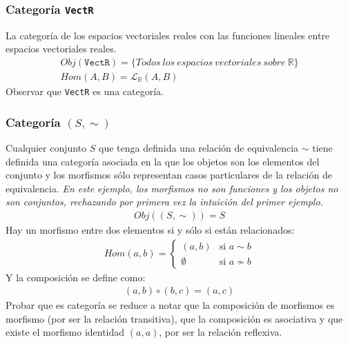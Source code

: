 \documentclass[a4paper, 11pt]{amsart}
\newcommand{\twopartdef}[4]
{
	\left\{
		\begin{array}{ll}
			#1 & \mbox{si } #2 \\
			#3 & \mbox{si } #4
		\end{array}
	\right.
}
\theoremstyle{definition}
\theoremstyle{remark}
\numberwithin{equation}{section}
\begin{document}
    \subsubsection{Categoría \texttt{VectR}}
      La categoría de los espacios vectoriales reales con las funciones lineales entre
      espacios vectoriales reales.
      \begin{gather*}
        Obj(\texttt{VectR}) = \{Todos\ los\ espacios\ vectoriales\ sobre\ \mathbb{R}\} \\
        Hom(A,B)= \mathcal{L}_{\mathbb{R}}(A,B)
      \end{gather*}
      \exca Observar que \texttt{VectR} es una categoría.
    
    \subsubsection{Categoría \texttt{$(S,\sim)$}}
      Cualquier conjunto $S$ que tenga definida una relación de equivalencia $\sim$ tiene
      definida una categoría asociada en la que los objetos son los elementos del conjunto
      y los morfismos sólo representan casos particulares de la relación de equivalencia.
      \textit{En este ejemplo, los morfismos no son funciones y los objetos no son conjuntos,
      rechazando por primera vez la intuición del primer ejemplo.}
      \begin{gather*}
        Obj((S,\sim)) = S
      \end{gather*}
      Hay un morfismo entre dos elementos si y sólo si están relacionados:
      \begin{align*}
        Hom(a,b)= \twopartdef{(a,b)}{a \sim b}{\emptyset}{a \nsim b}
      \end{align*}
      Y la composición se define como:
      \begin{align*}
       (a,b) \circ (b,c) = (a,c)
      \end{align*}
      Probar que es categoría se reduce a notar que la composición de morfismos es morfismo (por
      ser la relación transitiva), que la composición es asociativa y que existe el morfismo identidad
      $(a,a)$, por ser la relación reflexiva.
      
\end{document}
